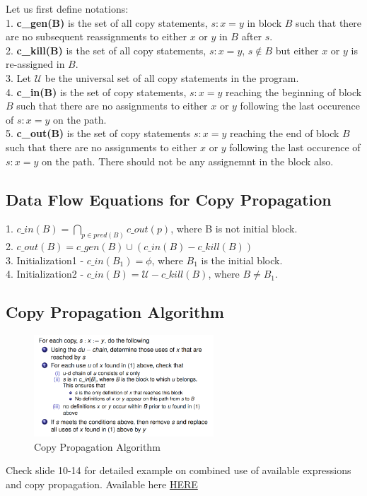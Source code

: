 \documentclass{article}
\begin{document}
Let us first define notations: \\
1. \textbf{c\_gen(B)} is the set of all copy statements, $s: x = y$ in block $B$ such that there are no subsequent reassignments to either $x$ or $y$ in $B$ after $s$. \\
2. \textbf{c\_kill(B)} is the set of all copy statements, $s: x = y$, $s \notin B$ but either $x$ or $y$ is re-assigned in $B$. \\
3. Let $\mathcal{U}$ be the universal set of all copy statements in the program. \\
4. \textbf{c\_in(B)} is the set of copy statements, $s:x = y$ reaching the beginning of block $B$ such that there are no assignments to either $x$ or $y$ following the last occurence of $s: x = y$ on the path. \\
5. \textbf{c\_out(B)} is the set of copy statements $s:x = y$ reaching the end of block $B$ such that there are no assignments to either $x$ or $y$ following the last occurence of $s: x = y$ on the path. There should not be any assignemnt in the block also.\\

\subsection*{Data Flow Equations for Copy Propagation}
1. $c\_in(B) = \bigcap_{p \in pred(B)} c\_out(p)$, where B is not initial block. \\
2. $c\_out(B) = c\_gen(B) \cup (c\_in(B) - c\_kill(B))$ \\
3. Initialization1 - $c\_in(B_1) = \phi$, where $B_1$ is the initial block. \\
4. Initialization2 - $c\_in(B) = \mathcal{U} - c\_kill(B)$, where $B \neq B_1$. \\ 

\subsection*{Copy Propagation Algorithm}

\begin{figure}[h]
    \centering
    \includegraphics[width=0.6\textwidth]{Images/CP2.png}
    \caption{Copy Propagation Algorithm}
    \label{fig:CopyPropagation}
\end{figure}

Check slide 10-14 for detailed example on combined use of available expressions and copy propagation. Available here \href{https://people.iith.ac.in/ramakrishna/fc5264/dfa-based-optimizations.pdf}{HERE}
\end{document}
